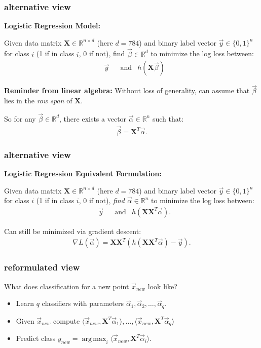 \documentclass[handout,compress]{beamer}
\newcommand{\bv}[1]{\mathbf{#1}}
\newcommand{\R}{\mathbb{R}}
\DeclareMathOperator*{\argmax}{arg\,max}
\begin{document}
\begin{frame} 
	\frametitle{alternative view}
		\textbf{Logistic Regression Model:}
	
	Given data matrix $\bv{X} \in \R^{n\times d}$ (here $d = 784$) and binary label vector $\vec{y}\in \{0,1\}^n$ for class $i$ (1 if in class $i$, 0 if not), find $\vec{\beta} \in \R^d$ to minimize the log loss between:
	\begin{align*}
	&\vec{y} & &\text{and} & h(\bv{X}\vec{\beta})
	\end{align*}
	
		
	\textbf{Reminder from linear algebra:}
	Without loss of generality, can assume that $\vec{\beta}$ lies in the \emph{row span} of $\bv{X}$. 
	
	So for any $\vec{\beta} \in \R^d$, there exists a vector $\vec{\alpha}\in \R^n$ such that:
	\begin{align*}
	\vec{\beta} = \bv{X}^T \vec{\alpha}.
	\end{align*}
	
\end{frame}

\begin{frame} 
	\frametitle{alternative view}
	\textbf{Logistic Regression Equivalent Formulation:}
	
	Given data matrix $\bv{X} \in \R^{n\times d}$ (here $d = 784$) and binary label vector $\vec{y}\in \{0,1\}^n$ for class $i$ (1 if in class $i$, 0 if not), \alert{\emph{find $\vec{\alpha} \in \R^n$}} to minimize the log loss between:
	\begin{align*}
	&\vec{y} & &\text{and} & h(\bv{X}\bv{X}^T\vec{\alpha}).
	\end{align*}
	
	Can still be minimized via gradient descent:
	\begin{align*}
		\nabla L(\vec{\alpha}) = \bv{X}\bv{X}^T(h(\bv{X}\bv{X}^T\vec{\alpha}) - \vec{y}).
	\end{align*}
	
\end{frame}

\begin{frame} 
	\frametitle{reformulated view}
	What does classification for a new point $\vec{x}_{new}$ look like?
	
	\begin{itemize}
	\item Learn $q$ classifiers with parameters $\vec{\alpha}_1, \vec{\alpha}_2, \ldots, \vec{\alpha}_q$.
	\item Given $\vec{x}_{new}$ compute $\langle \vec{x}_{new}, \bv{X}^T\vec{\alpha}_1\rangle, \ldots, \langle\vec{x}_{new}, \bv{X}^T\vec{\alpha}_q\rangle$
	\item Predict class $y_{new} = \argmax_i \langle\vec{x}_{new}, \bv{X}^T\vec{\alpha}_i\rangle$.
\end{itemize}
	
\end{frame}
\end{document}
